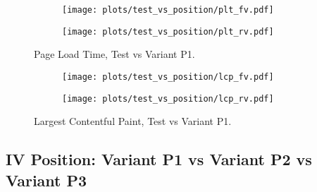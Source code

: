 


\begin{figure}
	\centering
	\begin{subfigure}{.5\textwidth}
		\centering
		\texttt{[image: plots/test\_vs\_position/plt\_fv.pdf]}
		\label{fig:sub1}
	\end{subfigure}%
	\begin{subfigure}{.5\textwidth}
		\centering
		\texttt{[image: plots/test\_vs\_position/plt\_rv.pdf]}
		\label{fig:sub2}
	\end{subfigure}
	\caption{Page Load Time, Test vs Variant P1.}
	\label{figure:plt_original_test}
\end{figure}

\clearpage

\begin{figure}
	\centering
	\begin{subfigure}{.5\textwidth}
		\centering
		\texttt{[image: plots/test\_vs\_position/lcp\_fv.pdf]}
		\label{fig:sub1}
	\end{subfigure}%
	\begin{subfigure}{.5\textwidth}
		\centering
		\texttt{[image: plots/test\_vs\_position/lcp\_rv.pdf]}
		\label{fig:sub2}
	\end{subfigure}
	\caption{Largest Contentful Paint, Test vs Variant P1.}
	\label{figure:plt_original_test}
\end{figure}






\subsection{IV Position: Variant P1 vs Variant P2 vs Variant P3}







